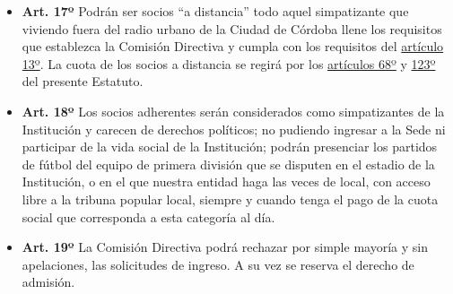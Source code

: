 \documentclass[openany]{book}
\providecommand{\tightlist}{%
  \setlength{\itemsep}{0pt}\setlength{\parskip}{0pt}}
\begin{document}
\begin{itemize}
\tightlist
\item
  \textbf{Art. 17º}
  Podrán ser socios ``a distancia'' todo aquel simpatizante que viviendo fuera del radio urbano de la Ciudad de Córdoba llene los requisitos que establezca la Comisión Directiva y cumpla con los requisitos del \protect\hyperlink{art13}{artículo 13º}. La cuota de los socios a distancia se regirá por los \protect\hyperlink{art68}{artículos 68º} y \protect\hyperlink{art123}{123º} del presente Estatuto.
\end{itemize}

\begin{itemize}
\tightlist
\item
  \textbf{Art. 18º}
  Los socios adherentes serán considerados como simpatizantes de la Institución y carecen de derechos políticos; no pudiendo ingresar a la Sede ni participar de la vida social de la Institución; podrán presenciar los partidos de fútbol del equipo de primera división que se disputen en el estadio de la Institución, o en el que nuestra entidad haga las veces de local, con acceso libre a la tribuna popular local, siempre y cuando tenga el pago de la cuota social que corresponda a esta categoría al día.
\end{itemize}

\begin{itemize}
\tightlist
\item
  \textbf{Art. 19º}
  La Comisión Directiva podrá rechazar por simple mayoría y sin apelaciones, las solicitudes de ingreso. A su vez se reserva el derecho de admisión.
\end{itemize}
\end{document}
